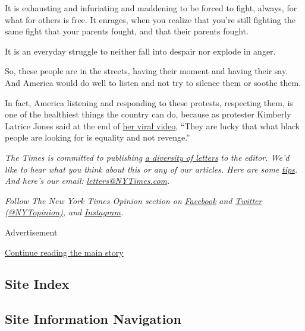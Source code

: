 It is exhausting and infuriating and maddening to be forced to fight,
always, for what for others is free. It enrages, when you realize that
you're still fighting the same fight that your parents fought, and that
their parents fought.

It is an everyday struggle to neither fall into despair nor explode in
anger.

So, these people are in the streets, having their moment and having
their say. And America would do well to listen and not try to silence
them or soothe them.

In fact, America listening and responding to these protests, respecting
them, is one of the healthiest things the country can do, because as
protester Kimberly Latrice Jones said at the end of
\href{https://www.instagram.com/tv/CA5gksAgvxJ/?utm_source=ig_embed}{her
viral video}, ``They are lucky that what black people are looking for is
equality and not revenge.''

\emph{The Times is committed to publishing}
\href{https://www.nytimes3xbfgragh.onion/2019/01/31/opinion/letters/letters-to-editor-new-york-times-women.html}{\emph{a
diversity of letters}} \emph{to the editor. We'd like to hear what you
think about this or any of our articles. Here are some}
\href{https://help.nytimes3xbfgragh.onion/hc/en-us/articles/115014925288-How-to-submit-a-letter-to-the-editor}{\emph{tips}}\emph{.
And here's our email:}
\href{mailto:letters@NYTimes.com}{\emph{letters@NYTimes.com}}\emph{.}

\emph{Follow The New York Times Opinion section on}
\href{https://www.facebookcorewwwi.onion/nytopinion}{\emph{Facebook}}
\emph{and} \href{http://twitter.com/NYTOpinion}{\emph{Twitter
(@NYTopinion)}}\emph{, and}
\href{https://www.instagram.com/nytopinion/}{\emph{Instagram}}\emph{.}

Advertisement

\protect\hyperlink{after-bottom}{Continue reading the main story}

\hypertarget{site-index}{%
\subsection{Site Index}\label{site-index}}

\hypertarget{site-information-navigation}{%
\subsection{Site Information
Navigation}\label{site-information-navigation}}

